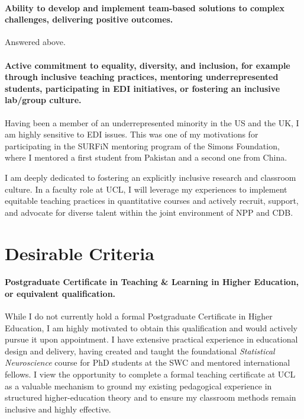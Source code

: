 \documentclass{article}
\begin{document}
\paragraph{Ability to develop and implement team-based solutions to complex challenges,
delivering positive outcomes.}

Answered above.

\paragraph{Active commitment to equality, diversity, and inclusion, for example
through inclusive teaching practices, mentoring underrepresented students,
participating in EDI initiatives, or fostering an inclusive lab/group
culture.}

Having been a member of an underrepresented minority in the US and the UK, I am
highly sensitive to EDI issues. This was one of my motivations for
participating in the SURFiN mentoring program of the Simons Foundation, where I
mentored a first student from Pakistan and a second one from China.

I am deeply dedicated to fostering an explicitly inclusive research and
classroom culture. In a faculty role at UCL, I will leverage my experiences to
implement equitable teaching practices in quantitative courses and actively
recruit, support, and advocate for diverse talent within the joint environment
of NPP and CDB.

\section*{Desirable Criteria}

\paragraph{Postgraduate Certiﬁcate in Teaching \& Learning in Higher Education,
or equivalent qualiﬁcation.}

While I do not currently hold a formal Postgraduate Certificate in Higher
Education, I am highly motivated to obtain this qualification and would
actively pursue it upon appointment. I have extensive practical experience in
educational design and delivery, having created and taught the foundational
\textit{Statistical Neuroscience} course for PhD students at the SWC and mentored international fellows. I view the opportunity to
complete a formal teaching certificate at UCL as a valuable mechanism to ground
my existing pedagogical experience in structured higher-education theory and to
ensure my classroom methods remain inclusive and highly effective.
\end{document}
